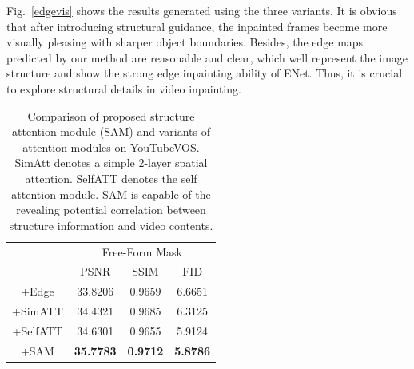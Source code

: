 Fig.~\ref{edgevis} shows the results generated using the three variants. 
It is obvious that after introducing structural guidance, the inpainted frames become more visually pleasing with sharper object boundaries. 
Besides, the edge maps predicted by our method are reasonable and clear, which well represent the image structure and show the strong edge inpainting ability of ENet. 
Thus, it is crucial to explore structural details in video inpainting.
 





\begin{table}[t]
	\caption{Comparison of proposed structure attention module (SAM) and variants of attention modules on YouTubeVOS. SimAtt denotes a simple 2-layer spatial attention. SelfATT denotes the self attention module. SAM is capable of the revealing potential correlation between structure information and video contents. }\smallskip
	\scriptsize
	\centering
	{
		\smallskip\begin{tabular}{c|c|c|c}
			\hline
			&\multicolumn{3}{c}{Free-Form Mask} \\
			\cline{2-4} 
			& PSNR & SSIM & FID\\
			
			\hline
			+Edge  &33.8206    &0.9659  &    6.6651 \\
			\hline
			
			+SimATT &34.4321    &0.9685  &   6.3125 \\
			
			\hline
			+SelfATT &34.6301 & 0.9655& 5.9124     \\
			
			\hline
			
			+SAM &\textbf{35.7783}    &\textbf{0.9712}  &   \textbf{5.8786}\\
			\hline
			
			
			
			
		\end{tabular}
	}
	\label{tab:sam_com}
\end{table}



